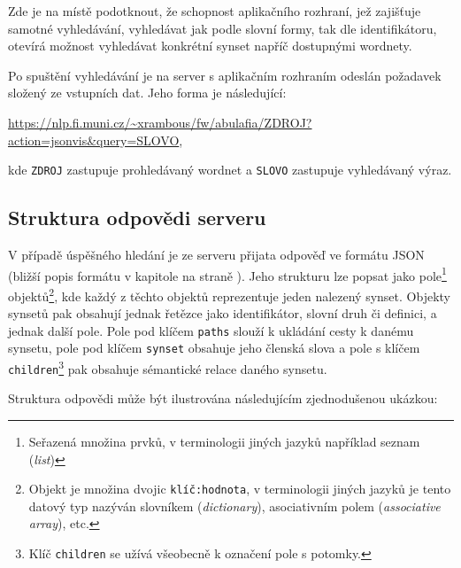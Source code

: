 \documentclass[a4paper, 11pt, oneside]{book}
\newcommand{\itNameRef}[1]{\textit{\nameref{#1}}}
\begin{document}
					Zde je na místě podotknout, že schopnost aplikačního rozhraní, jež zajišťuje samotné vyhledávání, vyhledávat jak podle slovní formy, tak dle identifikátoru, otevírá možnost vyhledávat konkrétní synset napříč dostupnými wordnety. 

					Po spuštění vyhledávání je na server s aplikačním rozhraním odeslán požadavek složený ze vstupních dat. Jeho forma je následující:

					\medskip
					\url{https://nlp.fi.muni.cz/~xrambous/fw/abulafia/ZDROJ?action=jsonvis&query=SLOVO}\hspace{1em},
					\medskip

					kde \texttt{ZDROJ} zastupuje prohledávaný wordnet a \texttt{SLOVO} zastupuje vyhledávaný výraz.

				\subsection{Struktura odpovědi serveru}
				\label{cha:answerStruct}

					V případě úspěšného hledání je ze serveru přijata odpověď ve formátu JSON (bližší popis formátu v kapitole \itNameRef{cha:json} na straně \pageref{cha:json}). Jeho strukturu lze popsat jako pole\footnote{Seřazená množina prvků, v terminologii jiných jazyků například seznam (\textit{list})} objektů\footnote{Objekt je množina dvojic \texttt{klíč:hodnota}, v terminologii jiných jazyků je tento datový typ nazýván slovníkem (\textit{dictionary}), asociativním polem (\textit{associative array}), etc.}, kde každý z těchto objektů reprezentuje jeden nalezený synset. Objekty synsetů pak obsahují jednak řetězce jako identifikátor, slovní druh či definici, a jednak další pole. Pole pod klíčem \texttt{paths} slouží k ukládání cesty k danému synsetu, pole pod klíčem \texttt{synset} obsahuje jeho členská slova a pole s klíčem \texttt{children}\footnote{Klíč \texttt{children} se užívá všeobecně k označení pole s potomky.} pak obsahuje sémantické relace daného synsetu. 

					Struktura odpovědi může být ilustrována následujícím zjednodušenou ukázkou:
\end{document}
